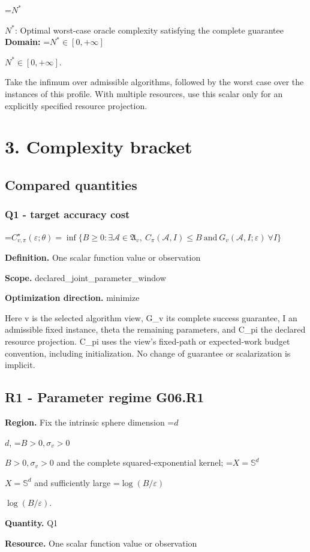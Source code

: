 \documentclass[10pt,a4paper]{article}
\newcommand{\AtlasMath}[1]{\par\begingroup\centering\setbox0=\hbox{$\displaystyle #1$}\ifdim\wd0>1.4\linewidth\typeout{ATLAS WIDE FORMULA: \the\wd0}\fi\ifdim\wd0>\linewidth\resizebox{\linewidth}{!}{\box0}\else\box0\fi\par\endgroup}
\newcommand{\AtlasInlineMath}[1]{\begingroup\setbox0=\hbox{$#1$}\ifdim\wd0>.4\linewidth\endgroup\AtlasMath{#1}\else\endgroup$#1$\fi}
\begin{document}
\AtlasInlineMath{N^*}: Optimal worst-case oracle complexity satisfying the complete guarantee \textbf{Domain:} \AtlasInlineMath{N^*\in[0,+\infty]}.

Take the infimum over admissible algorithms, followed by the worst case over the instances of this profile. With multiple resources, use this scalar only for an explicitly specified resource projection.

\section{3. Complexity bracket}
\subsection{Compared quantities}
\subsubsection{Q1 - target accuracy cost}
\AtlasMath{C^\star_{v,\pi}(\varepsilon;\theta)=\inf\{B\ge0:\exists\mathcal A\in\mathfrak A_v,\ C_\pi(\mathcal A,I)\le B\ \text{and}\ G_v(\mathcal A,I;\varepsilon)\ \forall I\}}
\textbf{Definition.} One scalar function value or observation

\textbf{Scope.} declared\_joint\_parameter\_window

\textbf{Optimization direction.} minimize

Here v is the selected algorithm view, G\_v its complete success guarantee, I an admissible fixed instance, theta the remaining parameters, and C\_pi the declared resource projection. C\_pi uses the view's fixed-path or expected-work budget convention, including initialization. No change of guarantee or scalarization is implicit.

\subsection{R1 - Parameter regime G06.R1}
\textbf{Region.} Fix the intrinsic sphere dimension \AtlasInlineMath{d}, \AtlasInlineMath{B>0,\sigma_v>0} and the complete squared-exponential kernel; \AtlasInlineMath{X=\mathbb{S}^d} and sufficiently large \AtlasInlineMath{\log(B/\varepsilon)}.

\textbf{Quantity.} Q1

\textbf{Resource.} One scalar function value or observation
\end{document}
